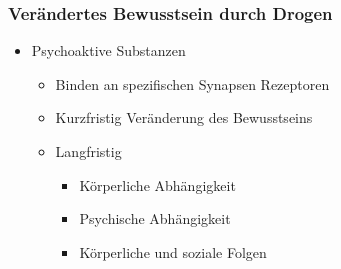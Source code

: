 \subsubsection{Verändertes Bewusstsein durch Drogen}
\begin{itemize}
	\item Psychoaktive Substanzen
		\begin{itemize}
			\item Binden an spezifischen Synapsen Rezeptoren
			\item Kurzfristig Veränderung des Bewusstseins
			\item Langfristig
				\begin{itemize}
					\item Körperliche Abhängigkeit
					\item Psychische Abhängigkeit
					\item Körperliche und soziale Folgen
				\end{itemize} 
		\end{itemize}
\end{itemize}








